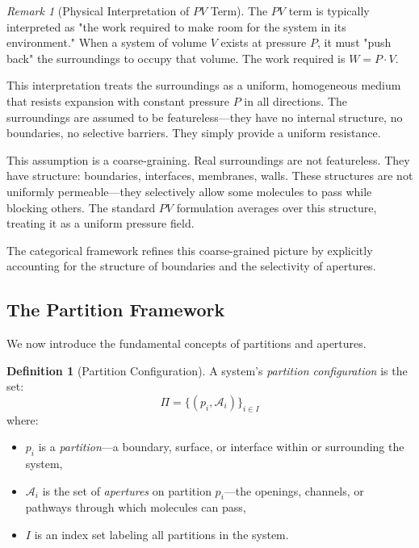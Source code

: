 \documentclass[12pt,a4paper]{article}
\theoremstyle{definition}
\newtheorem{definition}[theorem]{Definition}
\theoremstyle{remark}
\newtheorem{remark}[theorem]{Remark}
\begin{document}
\begin{remark}[Physical Interpretation of $PV$ Term]
\label{rem:pv_interpretation}
The $PV$ term is typically interpreted as "the work required to make room for the system in its environment." When a system of volume $V$ exists at pressure $P$, it must "push back" the surroundings to occupy that volume. The work required is $W = P \cdot V$.

This interpretation treats the surroundings as a uniform, homogeneous medium that resists expansion with constant pressure $P$ in all directions. The surroundings are assumed to be featureless—they have no internal structure, no boundaries, no selective barriers. They simply provide a uniform resistance.

This assumption is a coarse-graining. Real surroundings are not featureless. They have structure: boundaries, interfaces, membranes, walls. These structures are not uniformly permeable—they selectively allow some molecules to pass while blocking others. The standard $PV$ formulation averages over this structure, treating it as a uniform pressure field.
\end{remark}

The categorical framework refines this coarse-grained picture by explicitly accounting for the structure of boundaries and the selectivity of apertures.

\subsection{The Partition Framework}

We now introduce the fundamental concepts of partitions and apertures.

\begin{definition}[Partition Configuration]
\label{def:partition_config}
A system's \emph{partition configuration} is the set:
\begin{equation}
\Pi = \{(p_i, \mathcal{A}_i)\}_{i \in I}
\end{equation}
where:
\begin{itemize}
    \item $p_i$ is a \emph{partition}—a boundary, surface, or interface within or surrounding the system,
    \item $\mathcal{A}_i$ is the set of \emph{apertures} on partition $p_i$—the openings, channels, or pathways through which molecules can pass,
    \item $I$ is an index set labeling all partitions in the system.
\end{itemize}
\end{definition}
\end{document}
